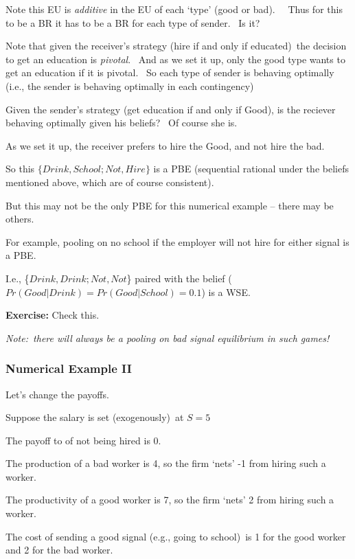 \documentclass{article}
\begin{document}
Note this EU is \textit{additive} in the EU of each `type' (good or bad). \
\ Thus for this to be a BR it has to be a BR for each type of sender. \ Is
it?

\bigskip

Note that given the receiver's strategy (hire if and only if educated)\ the
decision to get an education is \textit{pivotal}. \ And as we set it up,
only the good type wants to get an education if it is pivotal. \ So each
type of sender is behaving optimally (i.e., the sender is behaving optimally
in each contingency)

\bigskip

Given the sender's strategy (get education if and only if Good), is the
reciever behaving optimally given his beliefs? \ Of course she is. \ 

As we set it up, the receiver prefers to hire the Good, and not hire the
bad. \ 

So this $\{Drink,School;Not,Hire\}$ is a PBE  (sequential rational under the
beliefs mentioned above, which are of course consistent).

\bigskip

But this may not be the only PBE  for this numerical example -- there may be
others. \ 

For example, pooling on no school if the employer will not hire for either
signal is a PBE.

I.e., \{$Drink,Drink;Not,Not$\} paired with the belief ($%
Pr(Good|Drink)=Pr(Good|School)=0.1$) is a WSE.

\textbf{Exercise: }Check this.

\bigskip 

\textit{Note:\ there will always be a pooling on bad signal equilibrium in
such games!}\bigskip 

\subsubsection{Numerical Example II}

Let's change the payoffs.

Suppose the salary is set (exogenously)\ at $S=5$

The payoff to of not being hired is $0.$

The production of a bad worker is 4, so the firm `nets' -1 from hiring such
a worker.

The productivity of a good worker is 7, so the firm `nets' 2 from hiring
such a worker.

The cost of sending a good signal (e.g., going to school)\ is 1 for the good
worker and 2 for the bad worker.
\end{document}
